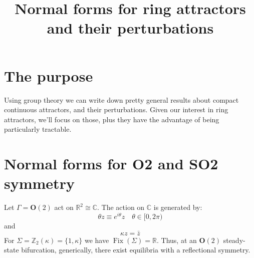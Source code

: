 \documentclass{scrartcl}
\title{Normal forms for ring attractors and their perturbations}
\author{}
\date{}
\begin{document}
  \maketitle
  \section{The purpose}
    Using group theory we can write down pretty general results about compact continuous attractors, and their perturbations.
    Given our interest in ring attractors, we'll focus on those, plus they have the advantage of being particularly tractable.
  \section{Normal forms for O2 and SO2 symmetry}
    \begin{example}\label{notes_normal_forms:ex:1.33}
      Let \(\Gamma=\mathbf{O}(2)\) act on \(\mathbb{R}^{2} \cong \mathbb{C}\).
      The action on \(\mathbb{C}\) is generated by:
      \begin{equation*}
        \theta z \equiv e^{i \theta} z \quad \theta \in[0, 2 \pi)
      \end{equation*}
      and
      \begin{equation*}
        \kappa z=\bar{z}
      \end{equation*}
      For \(\Sigma=\mathbb{Z}_{2}(\kappa)=\{1, \kappa\}\) we have \(\operatorname{Fix}(\Sigma)=\mathbb{R}\).
      Thus, at an \(\mathbf{O}(2)\) steady-state bifurcation, generically, there exist equilibria with a reflectional symmetry.
    \end{example}
\end{document}
